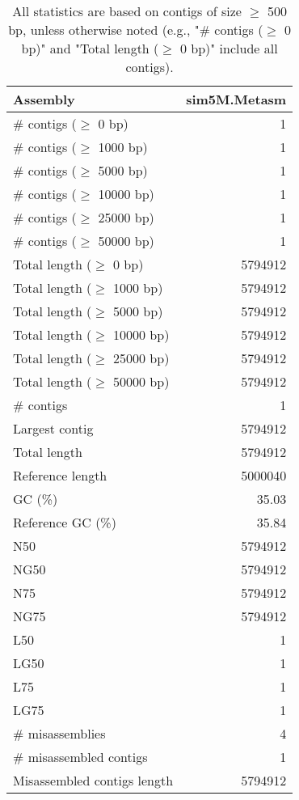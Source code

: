 \documentclass[12pt,a4paper]{article}
\begin{document}
\begin{table}[ht]
\begin{center}
\caption{All statistics are based on contigs of size $\geq$ 500 bp, unless otherwise noted (e.g., "\# contigs ($\geq$ 0 bp)" and "Total length ($\geq$ 0 bp)" include all contigs).}
\begin{tabular}{|l*{1}{|r}|}
\hline
Assembly & sim5M.Metasm \\ \hline
\# contigs ($\geq$ 0 bp) & 1 \\ \hline
\# contigs ($\geq$ 1000 bp) & 1 \\ \hline
\# contigs ($\geq$ 5000 bp) & 1 \\ \hline
\# contigs ($\geq$ 10000 bp) & 1 \\ \hline
\# contigs ($\geq$ 25000 bp) & 1 \\ \hline
\# contigs ($\geq$ 50000 bp) & 1 \\ \hline
Total length ($\geq$ 0 bp) & 5794912 \\ \hline
Total length ($\geq$ 1000 bp) & 5794912 \\ \hline
Total length ($\geq$ 5000 bp) & 5794912 \\ \hline
Total length ($\geq$ 10000 bp) & 5794912 \\ \hline
Total length ($\geq$ 25000 bp) & 5794912 \\ \hline
Total length ($\geq$ 50000 bp) & 5794912 \\ \hline
\# contigs & 1 \\ \hline
Largest contig & 5794912 \\ \hline
Total length & 5794912 \\ \hline
Reference length & 5000040 \\ \hline
GC (\%) & 35.03 \\ \hline
Reference GC (\%) & 35.84 \\ \hline
N50 & 5794912 \\ \hline
NG50 & 5794912 \\ \hline
N75 & 5794912 \\ \hline
NG75 & 5794912 \\ \hline
L50 & 1 \\ \hline
LG50 & 1 \\ \hline
L75 & 1 \\ \hline
LG75 & 1 \\ \hline
\# misassemblies & 4 \\ \hline
\# misassembled contigs & 1 \\ \hline
Misassembled contigs length & 5794912 \\ \hline

\end{tabular}
\end{center}
\end{table}
\end{document}
